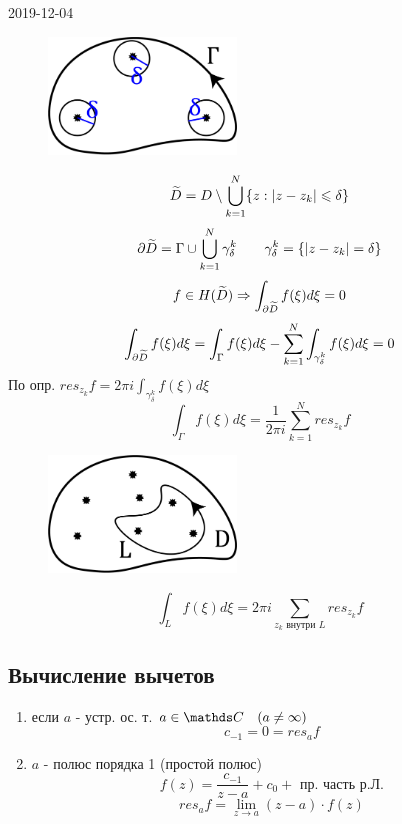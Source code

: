 \documentclass[main]{subfiles}
\begin{document}
\begin{lect}{2019-12-04}
    \begin{Proof}
        \begin{figure}[H]
            \includegraphics[width=5cm]{pics/13_5.png}
            \centering
        \end{figure}
        
        \[\widetilde{D} = D \setminus \bigcup_{k = 1}^N  \{z : \left|z - z_k\right| \leqslant \delta\}\]
        \[\partial \widetilde{D} = \Gamma \cup \bigcup_{k = 1}^N \gamma_\delta^k \qquad
        \gamma_\delta^k = \{\left|z - z_k\right| = \delta\}\]
        \[f \in H(\widetilde{D}) \Rightarrow \int_{\partial \widetilde{D}} f(\xi)d\xi = 0 \]
        \[\int_{\partial \widetilde{D}} f(\xi)d\xi = \int_{\Gamma} f(\xi)d\xi -
        \sum_{k = 1}^N \int_{\gamma_\delta^k} f(\xi)d\xi = 0  \]
        По опр. $res_{z_k} f = 2\pi i \int_{\gamma_\delta^k} f(\xi)d\xi  $
        \[\int_\Gamma f(\xi) d\xi = \frac{1}{2\pi i} \sum_{k = 1}^N res_{z_k} f  \]
        \begin{figure}[H]
            \includegraphics[width=5cm]{pics/13_6.png}
            \centering
        \end{figure}
        
        \[\int_{L} f(\xi)d\xi = 2\pi i \sum_{z_k \text{ внутри } L}  res_{z_k} f  \]
    \end{Proof}

    \subsection{Вычисление вычетов}

    \begin{definition}
        \begin{enumerate}
            \item если $a$ - устр. ос. т. \q $a \in \CC \q (a \neq \infty)$
                \[c_{-1} = 0 = res_a f \]
            \item $a$ - полюс порядка 1 (простой полюс)
                \[f(z) = \frac{c_{-1} }{z - a} + c_0 + \text{ пр. часть р.Л.}\]
                \[res_a f = \lim_{z \to a} (z - a) \cdot f(z) \]
        \end{enumerate}
    \end{definition}


\end{lect}
\end{document}
